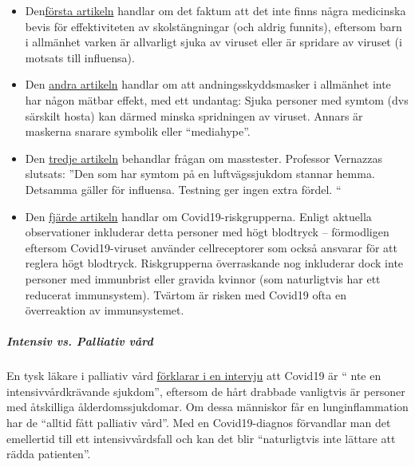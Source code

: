 \begin{itemize}
\tightlist
\item
  Den\href{https://infekt.ch/2020/04/schulen-schliessen-hilfreich-oder-nicht/}{första
  artikeln} handlar om det faktum att det inte finns några medicinska
  bevis för effektiviteten av skolstängningar (och aldrig funnits),
  eftersom barn i allmänhet varken är allvarligt sjuka av viruset eller
  är spridare av viruset (i motsats till influensa).
\item
  Den
  \href{https://infekt.ch/2020/04/atemschutzmasken-fuer-alle-medienhype-oder-unverzichtbar/}{andra
  artikeln} handlar om att andningsskyddsmasker i allmänhet inte har
  någon mätbar effekt, med ett undantag: Sjuka personer med symtom (dvs
  särskilt hosta) kan därmed minska spridningen av viruset. Annars är
  maskerna snarare symbolik eller ``mediahype''.
\item
  Den
  \href{https://infekt.ch/2020/04/corona-testen-testen-und-kein-ende/}{tredje
  artikeln} behandlar frågan om masstester. Professor Vernazzas
  slutsats: ''Den som har symtom på en luftvägssjukdom stannar hemma.
  Detsamma gäller för influensa. Testning ger ingen extra fördel. ``
\item
  Den
  \href{https://infekt.ch/2020/03/immunschwaeche-und-schwangerschaft-kein-covid-19-risikofaktor/}{fjärde
  artikeln} handlar om Covid19-riskgrupperna. Enligt aktuella
  observationer inkluderar detta personer med högt blodtryck --
  förmodligen eftersom Covid19-viruset använder cellreceptorer som också
  ansvarar för att reglera högt blodtryck. Riskgrupperna överraskande
  nog inkluderar dock inte personer med immunbrist eller gravida kvinnor
  (som naturligtvis har ett reducerat immunsystem). Tvärtom är risken
  med Covid19 ofta en överreaktion av immunsystemet.
\end{itemize}

\hypertarget{intensiv-vs-palliativ-vuxe5rd}{%
\subparagraph{\texorpdfstring{\textbf{Intensiv vs. Palliativ
vård}}{Intensiv vs. Palliativ vård}}\label{intensiv-vs-palliativ-vuxe5rd}}

En tysk läkare i palliativ vård
\href{https://www.ruhr24.de/ruhrgebiet/coronavirus-behandlung-intensivstation-nrw-lungenentzuendung-matthias-thoens-witten-zr-13645038.html}{förklarar
i en intervju} att Covid19 är `` nte en intensivvårdkrävande sjukdom'',
eftersom de hårt drabbade vanligtvis är personer med åtskilliga
ålderdomssjukdomar. Om dessa människor får en lunginflammation har de
``alltid fått palliativ vård''. Med en Covid19-diagnos förvandlar man
det emellertid till ett intensivvårdsfall och kan det blir
``naturligtvis inte lättare att rädda patienten''.

